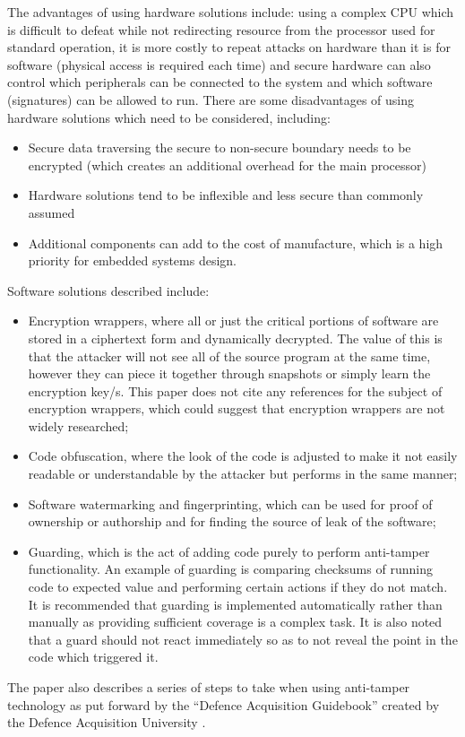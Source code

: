 The advantages of using hardware solutions include: using a complex CPU which is difficult to defeat while not redirecting resource from the processor used for standard operation, it is more costly to repeat attacks on hardware than it is for software (physical access is required each time) and secure hardware can also control which peripherals can be connected to the system and which software (signatures) can be allowed to run. There are some disadvantages of using hardware solutions which need to be considered, including:
\begin{itemize}
	\item Secure data traversing the secure to non-secure boundary needs to be encrypted (which creates an additional overhead for the main processor)
	\item Hardware solutions tend to be inflexible and less secure than commonly assumed
	\item Additional components can add to the cost of manufacture, which is a high priority for embedded systems design.
\end{itemize}
Software solutions described include:
\begin{itemize}
	\item Encryption wrappers, where all or just the critical portions of software are stored in a ciphertext form and dynamically decrypted. The value of this is that the attacker will not see all of the source program at the same time, however they can piece it together through snapshots or simply learn the encryption key/s. This paper does not cite any references for the subject of encryption wrappers, which could suggest that encryption wrappers are not widely researched;
	\item Code obfuscation, where the look of the code is adjusted to make it not easily readable or understandable by the attacker but performs in the same manner;
	\item Software watermarking and fingerprinting, which can be used for proof of ownership or authorship and for finding the source of leak of the software;
	\item Guarding, which is the act of adding code purely to perform anti-tamper functionality. An example of guarding is comparing checksums of running code to expected value and performing certain actions if they do not match. It is recommended that guarding is implemented automatically rather than manually as providing sufficient coverage is a complex task. It is also noted that a guard should not react immediately so as to not reveal the point in the code which triggered it.
\end{itemize}
The paper also describes a series of steps to take when using anti-tamper technology as put forward by the ``Defence Acquisition Guidebook'' created by the Defence Acquisition University \cite{DAU2011}.

